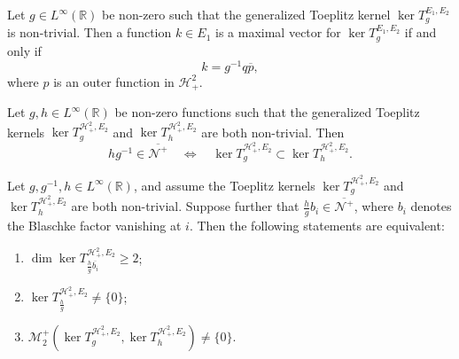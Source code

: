 \documentclass[10pt,a4paper]{amsart}
\begin{document}
\begin{Proposition} \label{thm4}
Let \( g \in L^\infty(\mathbb{R}) \) be non-zero such that the generalized Toeplitz kernel \( \ker T_g^{E_1, E_2} \) is non-trivial. Then a function \( k \in E_1 \) is a maximal vector for \( \ker T_g^{E_1, E_2} \) if and only if
\[
k = g^{-1} q \overline{p},
\]
where \( p \) is an outer function in \( \mathcal{H}_+^2 \).
\end{Proposition}

\begin{Proposition}\label{thm1}
Let \( g, h \in L^\infty(\mathbb{R}) \) be non-zero functions such that the generalized Toeplitz kernels \( \ker T_g^{\mathcal{H}^2_+, E_2} \) and \( \ker T_h^{\mathcal{H}^2_+, E_2} \) are both non-trivial. Then
\[
hg^{-1} \in \overline{\mathcal{N}^+} \quad \Longleftrightarrow \quad \ker T_g^{\mathcal{H}^2_+, E_2} \subset \ker T_h^{\mathcal{H}^2_+, E_2}.
\]
\end{Proposition}

\begin{theorem}\label{thm3}
Let \( g, g^{-1}, h \in L^\infty(\mathbb{R}) \), and assume the Toeplitz kernels \( \ker T_g^{\mathcal{H}^2_+, E_2} \) and \( \ker T_h^{\mathcal{H}^2_+, E_2} \) are both non-trivial. Suppose further that \( \frac{h}{g}b_i \in \overline{\mathcal{N}^+} \), where \( b_i \) denotes the Blaschke factor vanishing at \( i \). Then the following statements are equivalent:
\begin{enumerate}
    \item[\textnormal{(1)}] \( \dim \ker T_{\frac{h}{g} \overline{b_i}}^{\mathcal{H}^2_+, E_2} \geq 2 \);
    \item[\textnormal{(2)}] \( \ker T_{\frac{h}{g}}^{\mathcal{H}^2_+, E_2} \neq \{0\} \);
    \item[\textnormal{(3)}] \( \mathcal{M}_2^+(\ker T_g^{\mathcal{H}^2_+, E_2}, \ker T_h^{\mathcal{H}^2_+, E_2}) \neq \{0\} \).
\end{enumerate}
\end{theorem}
\end{document}
